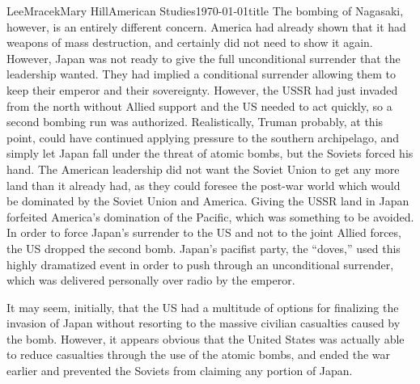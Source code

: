 \documentclass{article}
\begin{document}
\begin{mla}{Lee}{Mracek}{Mary Hill}{American Studies}{\today}{title}
                    The bombing of Nagasaki, however, is an entirely different concern. America had already shown that it had weapons of mass destruction, and certainly did not need to show it again. However, Japan was not ready to give the full unconditional surrender that the leadership wanted. They had implied a conditional surrender allowing them to keep their emperor and their sovereignty. However, the USSR had just invaded from the north without Allied support and the US needed to act quickly, so a second bombing run was authorized. Realistically, Truman probably, at this point, could have continued applying pressure to the southern archipelago, and simply let Japan fall under the threat of atomic bombs, but the Soviets forced his hand. The American leadership did not want the Soviet Union to get any more land than it already had, as they could foresee the post-war world which would be dominated by the Soviet Union and America. Giving the USSR land in Japan forfeited America's domination of the Pacific, which was something to be avoided. In order to force Japan's surrender to the US and not to the joint Allied forces, the US dropped the second bomb. Japan's pacifist party, the ``doves,'' used this highly dramatized event in order to push through an unconditional surrender, which was delivered personally over radio by the emperor.

                       It may seem, initially, that the US had a multitude of options for finalizing the invasion of Japan without resorting to the massive civilian casualties caused by the bomb. However, it appears obvious that the United States was actually able to reduce casualties through the use of the atomic bombs, and ended the war earlier and prevented the Soviets from claiming any portion of Japan.
                   \end{mla}
\end{document}
